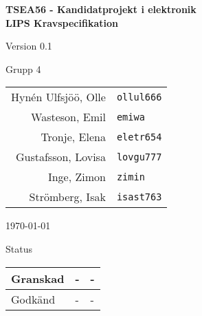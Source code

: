 \documentclass[11pt]{article}
\begin{document}
\begin{titlepage}
\begin{center}

{\Large\bfseries TSEA56 - Kandidatprojekt i elektronik \\ LIPS Kravspecifikation}

\vspace{5em}

Version 0.1

\vspace{5em}
%
Grupp 4 \\
\begin{tabular}{rl}
Hynén Ulfsjöö, Olle&\verb+ollul666+
\\
Wasteson, Emil&\verb+emiwa+
\\
Tronje, Elena&\verb+eletr654+
\\
Gustafsson, Lovisa&\verb+lovgu777+
\\
Inge, Zimon&\verb+zimin+
\\
Strömberg, Isak&\verb+isast763+
\\
\end{tabular}

\vspace{5em}
\today

\vspace{18em}
Status
\begin{longtable}{|l|l|l|} \hline

Granskad & - & - \\ \hline
Godkänd & - & - \\ \hline
 
\end{longtable}

\end{center}
\end{titlepage}
\end{document}
